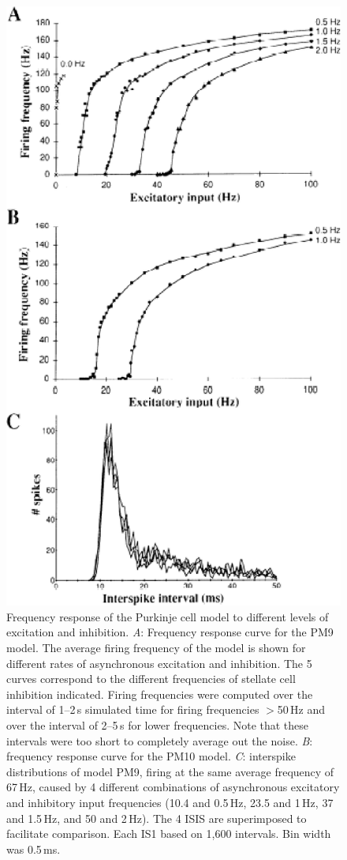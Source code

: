 \documentclass[12pt]{article}
\begin{document}
\begin{figure}[h]
\centering
   \includegraphics[scale=0.55]{figures/Fig.2.9.eps}
   \caption{Frequency response of the Purkinje cell model to different levels of excitation and inhibition. {\it A}: Frequency response curve for the PM9 model. The average firing frequency of the model is shown for different rates of asynchronous excitation and inhibition. The 5 curves correspond to the different frequencies of stellate cell inhibition indicated. Firing frequencies were computed over the interval of 1--2\,s simulated time for firing frequencies $>$50\,Hz and over the interval of 2--5\,s for lower frequencies. Note that these intervals were too short to completely average out the noise. {\it B}: frequency response curve for the PM10 model. {\it C}: interspike distributions of model PM9, firing at the same average frequency of 67\,Hz, caused by 4 different combinations of asynchronous excitatory and inhibitory input frequencies (10.4 and 0.5\,Hz, 23.5 and 1\,Hz, 37 and 1.5\,Hz, and 50 and 2\,Hz). The 4 ISIS are superimposed to facilitate comparison. Each IS1 based on 1,600 intervals. Bin width was 0.5\,ms.}
   \label{fig:DS2.9}
\end{figure}
\end{document}
